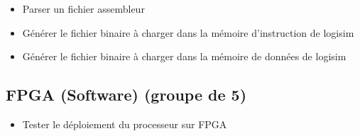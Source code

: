 \begin{itemize}
	\item Parser un fichier assembleur 
	\item Générer le fichier binaire à charger dans la mémoire d'instruction de logisim
	\item Générer le fichier binaire à charger dans la mémoire de données de logisim
\end{itemize}

\subsection{FPGA (Software) (groupe de 5)}

\begin{itemize}
	\item Tester le déploiement du processeur sur FPGA 
\end{itemize}
